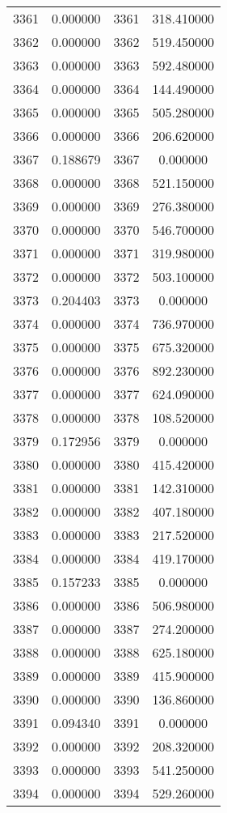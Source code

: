 \documentclass[12pt]{article}
\begin{document}
\begin{longtable}{@{}cccc@{}}
3361 & 0.000000 & 3361 & 318.410000 \\
3362 & 0.000000 & 3362 & 519.450000 \\
3363 & 0.000000 & 3363 & 592.480000 \\
3364 & 0.000000 & 3364 & 144.490000 \\
3365 & 0.000000 & 3365 & 505.280000 \\
3366 & 0.000000 & 3366 & 206.620000 \\
3367 & 0.188679 & 3367 & 0.000000 \\
3368 & 0.000000 & 3368 & 521.150000 \\
3369 & 0.000000 & 3369 & 276.380000 \\
3370 & 0.000000 & 3370 & 546.700000 \\
3371 & 0.000000 & 3371 & 319.980000 \\
3372 & 0.000000 & 3372 & 503.100000 \\
3373 & 0.204403 & 3373 & 0.000000 \\
3374 & 0.000000 & 3374 & 736.970000 \\
3375 & 0.000000 & 3375 & 675.320000 \\
3376 & 0.000000 & 3376 & 892.230000 \\
3377 & 0.000000 & 3377 & 624.090000 \\
3378 & 0.000000 & 3378 & 108.520000 \\
3379 & 0.172956 & 3379 & 0.000000 \\
3380 & 0.000000 & 3380 & 415.420000 \\
3381 & 0.000000 & 3381 & 142.310000 \\
3382 & 0.000000 & 3382 & 407.180000 \\
3383 & 0.000000 & 3383 & 217.520000 \\
3384 & 0.000000 & 3384 & 419.170000 \\
3385 & 0.157233 & 3385 & 0.000000 \\
3386 & 0.000000 & 3386 & 506.980000 \\
3387 & 0.000000 & 3387 & 274.200000 \\
3388 & 0.000000 & 3388 & 625.180000 \\
3389 & 0.000000 & 3389 & 415.900000 \\
3390 & 0.000000 & 3390 & 136.860000 \\
3391 & 0.094340 & 3391 & 0.000000 \\
3392 & 0.000000 & 3392 & 208.320000 \\
3393 & 0.000000 & 3393 & 541.250000 \\
3394 & 0.000000 & 3394 & 529.260000 \\

\end{longtable}
\end{document}
